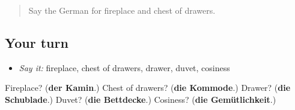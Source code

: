 \label{lesson:GE-R533-review-final-533}



\begin{quote}
Say the German for fireplace and chest of drawers.
\end{quote}

\subsection*{Your turn}
\begin{itemize}
\raggedright
  \item \emph{Say it:} fireplace, chest of drawers, drawer, duvet, cosiness
\end{itemize}

\begin{tcolorbox}[breakable,colback=teal!4,colframe=teal!35!black,title={Before you move on}]
Fireplace? (\textbf{der Kamin}.) Chest of drawers? (\textbf{die Kommode}.) Drawer? (\textbf{die Schublade}.) Duvet? (\textbf{die Bettdecke}.) Cosiness? (\textbf{die Gemütlichkeit}.)
\end{tcolorbox}
